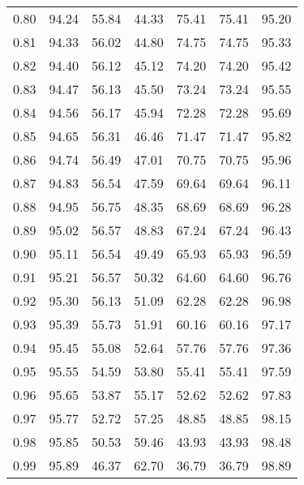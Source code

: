 \begin{tabular}{|c|c|c|c|c|c|c|}
      0.80 &     94.24 &     55.84 &      44.33 &   75.41 &      75.41 &         95.20 \\
      0.81 &     94.33 &     56.02 &      44.80 &   74.75 &      74.75 &         95.33 \\
      0.82 &     94.40 &     56.12 &      45.12 &   74.20 &      74.20 &         95.42 \\
      0.83 &     94.47 &     56.13 &      45.50 &   73.24 &      73.24 &         95.55 \\
      0.84 &     94.56 &     56.17 &      45.94 &   72.28 &      72.28 &         95.69 \\
      0.85 &     94.65 &     56.31 &      46.46 &   71.47 &      71.47 &         95.82 \\
      0.86 &     94.74 &     56.49 &      47.01 &   70.75 &      70.75 &         95.96 \\
      0.87 &     94.83 &     56.54 &      47.59 &   69.64 &      69.64 &         96.11 \\
      0.88 &     94.95 &     56.75 &      48.35 &   68.69 &      68.69 &         96.28 \\
      0.89 &     95.02 &     56.57 &      48.83 &   67.24 &      67.24 &         96.43 \\
      0.90 &     95.11 &     56.54 &      49.49 &   65.93 &      65.93 &         96.59 \\
      0.91 &     95.21 &     56.57 &      50.32 &   64.60 &      64.60 &         96.76 \\
      0.92 &     95.30 &     56.13 &      51.09 &   62.28 &      62.28 &         96.98 \\
      0.93 &     95.39 &     55.73 &      51.91 &   60.16 &      60.16 &         97.17 \\
      0.94 &     95.45 &     55.08 &      52.64 &   57.76 &      57.76 &         97.36 \\
      0.95 &     95.55 &     54.59 &      53.80 &   55.41 &      55.41 &         97.59 \\
      0.96 &     95.65 &     53.87 &      55.17 &   52.62 &      52.62 &         97.83 \\
      0.97 &     95.77 &     52.72 &      57.25 &   48.85 &      48.85 &         98.15 \\
      0.98 &     95.85 &     50.53 &      59.46 &   43.93 &      43.93 &         98.48 \\
      0.99 &     95.89 &     46.37 &      62.70 &   36.79 &      36.79 &         98.89 \\
\bottomrule
\end{tabular}
